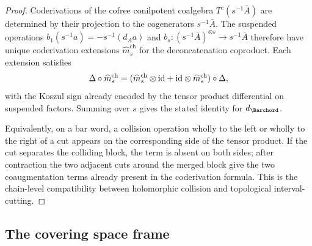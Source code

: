 \begin{proof}
Coderivations of the cofree conilpotent coalgebra
$T^c(s^{-1}\bar A)$ are determined by their projection to the
cogenerators $s^{-1}\bar A$. The suspended operations
$b_1(s^{-1}a)=-s^{-1}(d_Aa)$ and
$b_s\colon (s^{-1}\bar A)^{\otimes s}\to s^{-1}\bar A$
therefore have unique coderivation extensions
$\widehat m_s^{\mathrm{ch}}$ for the deconcatenation coproduct. Each
extension satisfies
\[
\Delta\circ\widehat m_s^{\mathrm{ch}}
=
(\widehat m_s^{\mathrm{ch}}\otimes\mathrm{id}
+\mathrm{id}\otimes\widehat m_s^{\mathrm{ch}})\circ\Delta ,
\]
with the Koszul sign already encoded by the tensor product
differential on suspended factors. Summing over $s$ gives the stated
identity for $d_{\Barchord}$.

Equivalently, on a bar word, a collision operation wholly to the left
or wholly to the right of a cut appears on the corresponding side of
the tensor product. If the cut separates the colliding block, the term
is absent on both sides; after contraction the two adjacent cuts around
the merged block give the two coaugmentation terms already present in
the coderivation formula. This is the chain-level compatibility between
holomorphic collision and topological interval-cutting.
\end{proof}

\subsection{The covering space frame}
\label{subsec:covering-space-frame}

